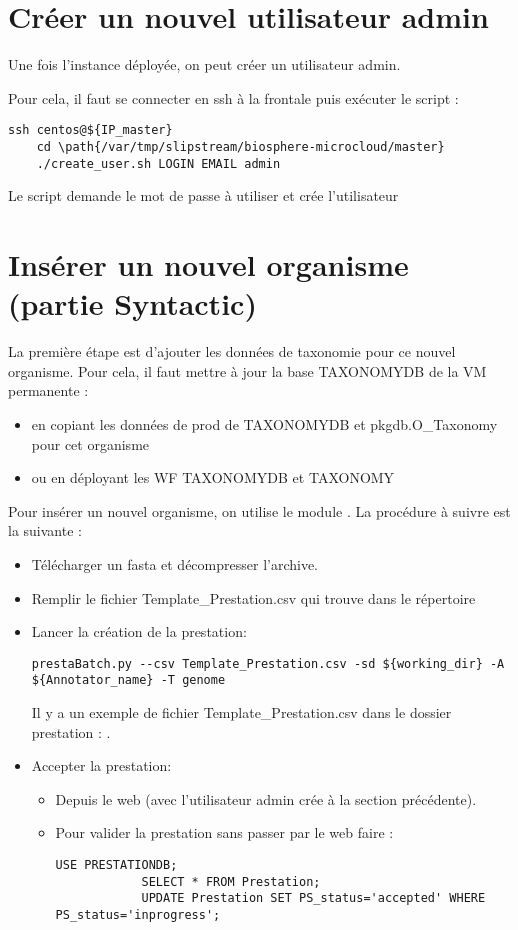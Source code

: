 \section{Créer un nouvel utilisateur admin}

Une fois l'instance déployée, on peut créer un utilisateur admin.

Pour cela, il faut se connecter en ssh à la frontale puis exécuter le script :
\begin{lstlisting}[style=Bash]
	ssh centos@${IP_master}
	cd \path{/var/tmp/slipstream/biosphere-microcloud/master}
	./create_user.sh LOGIN EMAIL admin
\end{lstlisting}
Le script demande le mot de passe à utiliser et crée l'utilisateur

\section{Insérer un nouvel organisme (partie Syntactic)}

La première étape est d'ajouter les données de taxonomie pour ce nouvel organisme.
Pour cela, il faut mettre à jour la base TAXONOMYDB de la VM permanente :
\begin{itemize}
	\item en copiant les données de prod de TAXONOMYDB et pkgdb.O\_Taxonomy pour cet organisme
	\item ou en déployant les WF TAXONOMYDB et TAXONOMY
\end{itemize}
\bigskip

Pour insérer un nouvel organisme, on utilise le module .
La procédure à suivre est la suivante :
\begin{itemize}
	\item Télécharger un fasta et décompresser l'archive.
	\item Remplir le fichier Template\_Prestation.csv qui trouve dans le répertoire 
	\item Lancer la création de la prestation:
\begin{lstlisting}[style=bash]
prestaBatch.py --csv Template_Prestation.csv -sd ${working_dir} -A ${Annotator_name} -T genome
\end{lstlisting}
        Il y a un exemple de fichier Template\_Prestation.csv dans le dossier prestation : .
    \item Accepter la prestation:
    \begin{itemize}
    	\item Depuis le web (avec l'utilisateur admin crée à la section précédente).
    	\item Pour valider la prestation sans passer par le web faire :
    	\begin{lstlisting}[style=SQL]
    		USE PRESTATIONDB;
    		SELECT * FROM Prestation;
    		UPDATE Prestation SET PS_status='accepted' WHERE PS_status='inprogress';
    	\end{lstlisting}
    \end{itemize} 
\end{itemize}


